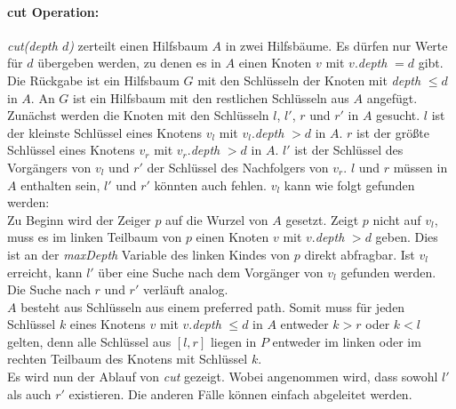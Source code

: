 \documentclass[a4paper,12pt]{article}
\begin{document}
\paragraph{cut Operation:} \label{cut}

\noindent \textit{cut(depth $d$)} zerteilt einen Hilfsbaum $A$ in zwei Hilfsbäume. Es dürfen nur Werte für $d$ übergeben werden, zu denen es in $A$ einen Knoten $v$ mit $v.$\textit{depth} $ = d $ gibt. Die Rückgabe ist ein Hilfsbaum $G$ mit den Schlüsseln der Knoten mit \textit{depth} $\leq d$ in $A$. An $G$ ist ein Hilfsbaum mit den restlichen Schlüsseln aus $A$ angefügt. Zunächst werden die Knoten mit den Schlüsseln $l$,  $l'$, $r$ und $r'$ in $A$ gesucht. $l$ ist der kleinste Schlüssel eines Knotens $v_l$ mit $v_l$.\textit{depth} $> d$  in $A$. $r$ ist der größte Schlüssel eines Knotens $v_r$ mit $v_r$.\textit{depth} $> d$  in $A$. $l'$ ist der Schlüssel des Vorgängers von $v_l$ und $r'$ der Schlüssel des Nachfolgers von $v_r$. $l$ und $r$ müssen in $A$ enthalten sein, $l'$ und $r'$ könnten auch fehlen. $v_l$ kann wie folgt gefunden werden:\\ Zu Beginn wird der Zeiger $p$ auf die Wurzel von $A$ gesetzt. Zeigt $p$ nicht auf $v_l$, muss es im linken Teilbaum von $p$ einen Knoten $v$ mit $v$.\textit{depth} $> d$ geben. Dies ist an der \textit{maxDepth} Variable des linken Kindes von $p$ direkt abfragbar. Ist $v_l$ erreicht, kann $l'$ über eine Suche nach dem Vorgänger von $v_l$ gefunden werden. Die Suche nach $r$ und $r'$ verläuft analog. \\
$A$ besteht aus Schlüsseln aus einem preferred path. Somit muss für jeden Schlüssel $k$ eines Knotens $v$ mit $v$.\textit{depth} $\leq d$ in $A$ entweder $k > r$ oder $k < l$ gelten, denn alle Schlüssel aus $\left[l,r\right]$ liegen in $P$ entweder im linken oder im rechten Teilbaum des Knotens mit Schlüssel $k$. \\
Es wird nun der Ablauf von \textit{cut} gezeigt. Wobei angenommen wird, dass sowohl $l'$ als auch $r'$ existieren. Die anderen Fälle können einfach abgeleitet werden.
\end{document}

